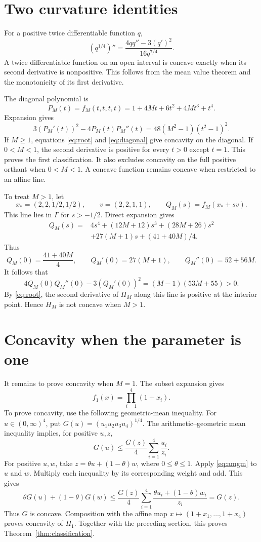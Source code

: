 \documentclass[11pt,a4paper]{article}
\begin{document}
\section{Two curvature identities}
For a positive twice differentiable function $q$,
\begin{equation}\label{eq:root}
 (q^{1/4})''=\frac{4qq''-3(q')^2}{16q^{7/4}}.
\end{equation}
A twice differentiable function on an open interval is concave exactly when its second derivative is nonpositive. This follows from the mean value theorem and the monotonicity of its first derivative.

The diagonal polynomial is
\[
 P_M(t)=f_M(t,t,t,t)=1+4Mt+6t^2+4Mt^3+t^4.
\]
Expansion gives
\begin{equation}\label{eq:diagonal}
 3(P_M'(t))^2-4P_M(t)P_M''(t)
 =48(M^2-1)(t^2-1)^2.
\end{equation}
If $M\geq1$, equations \eqref{eq:root} and \eqref{eq:diagonal} give concavity on the diagonal. If $0<M<1$, the second derivative is positive for every $t>0$ except $t=1$. This proves the first classification. It also excludes concavity on the full positive orthant when $0<M<1$. A concave function remains concave when restricted to an affine line.

To treat $M>1$, let
\[
 x_*=(2,2,1/2,1/2),\qquad v=(2,2,1,1),
 \qquad Q_M(s)=f_M(x_*+sv).
\]
This line lies in $\Gamma$ for $s>-1/2$. Direct expansion gives
\begin{align*}
 Q_M(s)={}&4s^4+(12M+12)s^3+(28M+26)s^2\\
          &+27(M+1)s+(41+40M)/4.
\end{align*}
Thus
\[
 Q_M(0)=\frac{41+40M}{4},\qquad
 Q_M'(0)=27(M+1),\qquad Q_M''(0)=52+56M.
\]
It follows that
\begin{equation}\label{eq:direction}
 4Q_M(0)Q_M''(0)-3(Q_M'(0))^2=(M-1)(53M+55)>0.
\end{equation}
By \eqref{eq:root}, the second derivative of $H_M$ along this line is positive at the interior point. Hence $H_M$ is not concave when $M>1$.

\section{Concavity when the parameter is one}
It remains to prove concavity when $M=1$. The subset expansion gives
\[
 f_1(x)=\prod_{i=1}^4(1+x_i).
\]
To prove concavity, use the following geometric-mean inequality.
For $u\in(0,\infty)^4$, put $G(u)=(u_1u_2u_3u_4)^{1/4}$. The arithmetic--geometric mean inequality implies, for positive $u,z$,
\begin{equation}\label{eq:amgm}
 G(u)\leq\frac{G(z)}4\sum_{i=1}^4\frac{u_i}{z_i}.
\end{equation}
For positive $u,w$, take $z=\theta u+(1-\theta)w$, where $0\leq\theta\leq1$. Apply \eqref{eq:amgm} to $u$ and $w$. Multiply each inequality by its corresponding weight and add. This gives
\[
 \theta G(u)+(1-\theta)G(w)
 \leq\frac{G(z)}4\sum_{i=1}^4
       \frac{\theta u_i+(1-\theta)w_i}{z_i}=G(z).
\]
Thus $G$ is concave. Composition with the affine map $x\mapsto(1+x_1,\ldots,1+x_4)$ proves concavity of $H_1$. Together with the preceding section, this proves Theorem~\ref{thm:classification}.
\end{document}
